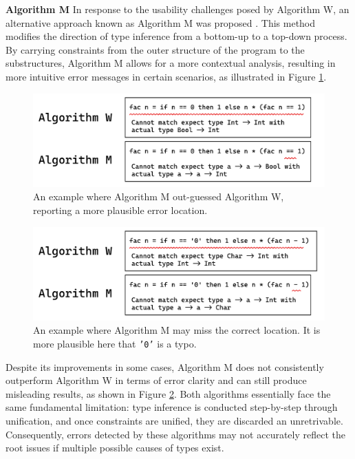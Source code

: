 \textbf{Algorithm M} 
In response to the usability challenges posed by Algorithm W, an alternative approach known as Algorithm M was proposed \cite{Lee1998-fx}. This method modifies the direction of type inference from a bottom-up to a top-down process. By carrying constraints from the outer structure of the program to the substructures, Algorithm M allows for a more contextual analysis, resulting in more intuitive error messages in certain scenarios, as illustrated in Figure \ref{fig:algorithm-m-1}. 

\begin{figure}[hbt]
  \includegraphics[width=0.8\linewidth]{AlgorithmWM1.pdf}
  \caption{
    \label{fig:algorithm-m-1}
      An example where Algorithm M out-guessed Algorithm W, reporting a more plausible error location.}
\end{figure}


\begin{figure}[hbt]
  \includegraphics[width=0.8\linewidth]{AlgorithmWM2}
  \caption{
    \label{fig:algorithm-m-2}
    An example where Algorithm M may miss the correct location. It is more plausible here that \texttt{'0'} is a typo.}
\end{figure}


Despite its improvements in some cases, Algorithm M does not consistently outperform Algorithm W in terms of error clarity and can still produce misleading results, as shown in Figure \ref{fig:algorithm-m-2}. Both algorithms essentially face the same fundamental limitation: type inference is conducted step-by-step through unification, and once constraints are unified, they are discarded an unretrivable. Consequently, errors detected by these algorithms may not accurately reflect the root issues if multiple possible causes of types exist.

